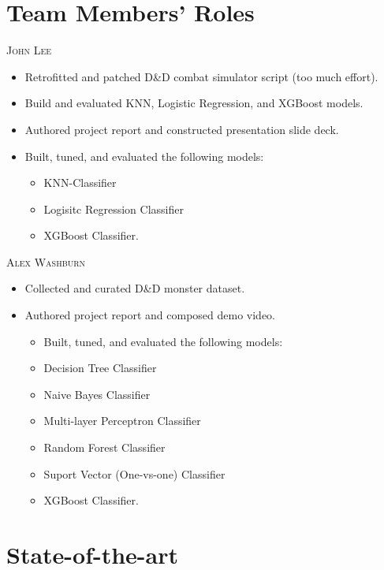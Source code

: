 \documentclass[12pt]{diazessay}
\begin{document}
\section{Team Members' Roles}


{\large\scshape John Lee}

\begin{itemize}
	\item Retrofitted and patched D\&D combat simulator script (too much effort).
	\item Build and evaluated KNN, Logistic Regression, and XGBoost models.
	\item Authored project report and constructed presentation slide deck.
	\item Built, tuned, and evaluated the following models:
	\begin{itemize}
		\item KNN-Classifier
		\item Logisitc Regression Classifier
		\item XGBoost Classifier.
	\end{itemize}
\end{itemize}

{\large\scshape Alex Washburn}

\begin{itemize}
	\item Collected and curated D\&D monster dataset.
	\item Authored project report and composed demo video.
	\begin{itemize}
	\item Built, tuned, and evaluated the following models:
		\item Decision Tree Classifier
		\item Naive Bayes Classifier
		\item Multi-layer Perceptron Classifier
		\item Random Forest Classifier
		\item Suport Vector (One-vs-one) Classifier
		\item XGBoost Classifier.
	\end{itemize}
\end{itemize}

\section{State-of-the-art}
\end{document}
